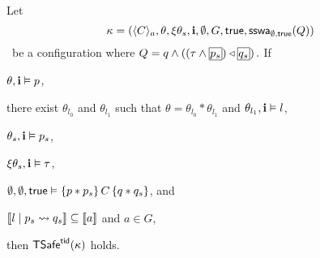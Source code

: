 \begin{lemma}[Shared]\label{lem:shared}
Let 
$$
\kappa=(\langle C \rangle_a,\theta,\xi\theta_s,{\bf i},\emptyset,G,\mathsf{true}, \mathsf{sswa}_{\emptyset,\mathsf{true}}(Q))
$$\, 
be a configuration where $Q = q \land ((\tau \land \shared{p_s}) \extend \shared{q_s})\,.$
If 
\begin{compactenum}		
\item \label{shared:local}
$\theta,{\bf i} \vDash p$,
\item \label{shared:hasguard}
there exist $\theta_{l_0}$ and $\theta_{l_1}$ such that $\theta = \theta_{l_0} * \theta_{l_1}$ and $\theta_{l_1},{\bf i} \vDash l$,
\item  \label{shared:shared}
$\theta_s, {\bf i} \vDash p_s$, %
\item  \label{shared:history}
$\xi\theta_s, {\bf i} \vDash \tau$, 
\item \label{shared:atomic}
$\emptyset,\emptyset,\mathsf{true} \vDash \{ p * p_s \} \,C\, \{ q * q_s \}$, and
\item \label{shared:guarantee}
$\llbracket l\mid p_s \leadsto q_s \rrbracket \subseteq \llbracket a \rrbracket$ and $a \in G$,
\end{compactenum}
then  
${\sf TSafe}^{{\sf tid}}(\kappa)$ holds.
\end{lemma}

